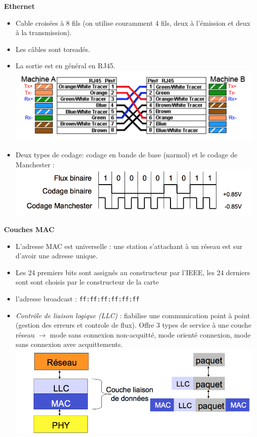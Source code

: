 \documentclass[a4paper,9pt, twocolumn]{article}
\begin{document}
	\textbf{Ethernet}
	\begin{itemize}
		\item Cable croisées à 8 fils (on utilise couramment 4 fils, deux à l'émission et deux à la transmission).
		\item Les câbles sont torsadés.
		\item La sortie est en général en RJ45.
			\includegraphics[scale=0.4]{RJ.png}
		\item Deux types de codage: codage en bande de base (narmol) et le codage de Manchester :
			\includegraphics[scale=0.4]{code.png}
	\end{itemize}

	\textbf{Couches MAC}
	\begin{itemize}
		\item L'adresse MAC est universelle : une station s'attachant à un réseau est sur d'avoir une adresse unique. 
		\item Les 24 premiers bits sont assignés au constructeur par l'IEEE, les 24 derniers sont sont choisis par le constructeur de la carte
		\item l'adresse broadcast : \texttt{ff:ff:ff:ff:ff:ff}
		\item \textit{Contrôle de liaison logique (LLC)} : fiabilise une communication point à point (gestion des erreurs et controle de flux).
			Offre 3 types de service à une couche réseau $\longrightarrow$ mode sans connexion non-acquitté, mode orienté connexion, mode sans connexion avec acquittements.		
			\includegraphics[scale=0.4]{LLC.png}
	\end{itemize}
\end{document}
